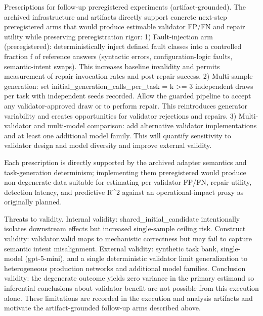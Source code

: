 \documentclass[conference]{IEEEtran}
\begin{document}
Prescriptions for follow-up preregistered experiments (artifact-grounded). The archived infrastructure and artifacts directly support concrete next-step preregistered arms that would produce estimable validator FP/FN and repair utility while preserving preregistration rigor:
  1) Fault-injection arm (preregistered): deterministically inject defined fault classes into a controlled fraction f of reference answers (syntactic errors, configuration-logic faults, semantic-intent swaps). This increases baseline invalidity and permits measurement of repair invocation rates and post-repair success.
  2) Multi-sample generation: set initial\_generation\_calls\_per\_task = k >= 3 independent draws per task with independent seeds recorded. Allow the guarded pipeline to accept any validator-approved draw or to perform repair. This reintroduces generator variability and creates opportunities for validator rejections and repairs.
  3) Multi-validator and multi-model comparison: add alternative validator implementations and at least one additional model family. This will quantify sensitivity to validator design and model diversity and improve external validity.

Each prescription is directly supported by the archived adapter semantics and task-generation determinism; implementing them preregistered would produce non-degenerate data suitable for estimating per-validator FP/FN, repair utility, detection latency, and predictive R\textasciicircum{}2 against an operational-impact proxy as originally planned.

Threats to validity. Internal validity: shared\_initial\_candidate intentionally isolates downstream effects but increased single-sample ceiling risk. Construct validity: validator.valid maps to mechanistic correctness but may fail to capture semantic intent misalignment. External validity: synthetic task bank, single-model (gpt-5-mini), and a single deterministic validator limit generalization to heterogeneous production networks and additional model families. Conclusion validity: the degenerate outcome yields zero variance in the primary estimand so inferential conclusions about validator benefit are not possible from this execution alone. These limitations are recorded in the execution and analysis artifacts and motivate the artifact-grounded follow-up arms described above.
\end{document}
